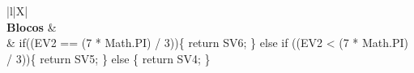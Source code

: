\begin{xltabular}{\textwidth}{|l|X|}
		 \\ \hline
		\textbf{Blocos} &  \\ \hline
		 & if((EV2 == (7 * Math.PI) / 3))\{   return SV6; \} else if ((EV2 < (7 * Math.PI) / 3))\{   return SV5; \} else \{   return SV4; \} \\ \hline



\end{xltabular}
